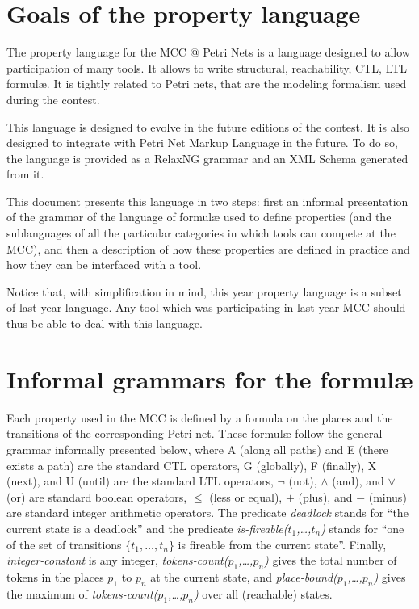 \documentclass[10pt,english,a4paper]{article}
\newcommand{\mcc}[0]{MCC}
\begin{document}
\color{defaultcolor}

\section*{Goals of the property language}
The property language for the \mcc{} @ Petri Nets is a language designed to allow
participation of many tools.
It allows to write structural, reachability, CTL, LTL formul{\ae}.
It is tightly related to Petri nets, that are the modeling formalism used during the contest.

This language is designed to evolve in the future editions of the contest.
It is also designed to integrate with Petri Net Markup Language in the future.
To do so, the language is provided as a RelaxNG grammar and an XML Schema generated from it.

This document presents this language in two steps: first an informal presentation of the grammar of the language of formulæ used to define properties (and the sublanguages of all the particular categories in which tools can compete at the MCC), and then a description of how these properties are defined in practice and how they can be interfaced with a tool.

Notice that, with simplification in mind, this year property language is a subset of last year language. Any tool which was participating in last year MCC should thus be able to deal with this language. 

\tableofcontents
\clearpage

\section{Informal grammars for the formulæ}

Each property used in the MCC is defined by a formula on the places and the transitions of the corresponding Petri net. These formulæ follow the general grammar informally presented below, where A (along all paths) and E (there exists a path) are the standard CTL operators, G (globally), F (finally), X (next), and U (until) are the standard LTL operators, $\lnot$ (not), $\wedge$ (and), and $\vee$ (or) are standard boolean operators, $\leq$ (less or equal), $+$ (plus), and $-$ (minus) are standard integer arithmetic operators.
The predicate \emph{deadlock} stands for ``the current state is a deadlock'' and the predicate \emph{is-fireable($t_1$,\dots,$t_n$)} stands for ``one of the set of transitions $\{t_1,\dots,t_n\}$ is fireable from the current state''.
Finally, \emph{integer-constant} is any integer, \emph{tokens-count($p_1$,\dots,$p_n$)} gives the total number of tokens in the places $p_1$ to $p_n$ at the current state, and \emph{place-bound($p_1$,\dots,$p_n$)} gives the maximum of \emph{tokens-count($p_1$,\dots,$p_n$)} over all (reachable) states.
\end{document}
